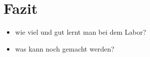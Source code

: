\chapter{Fazit}
\begin{itemize}
	\item wie viel und gut lernt man bei dem Labor?
	\item was kann noch gemacht werden?
\end{itemize}